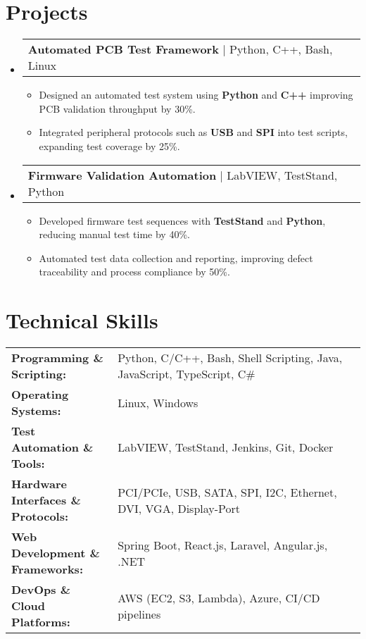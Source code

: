 \documentclass[letterpaper,11pt]{article}
\makeatletter
\newcommand{\resumeItem}[1]{
  \item\footnotesize{
    {#1 \vspace{-2pt}}
  }
}
\newcommand{\resumeProjectHeading}[2]{
    \item
    \begin{tabular*}{1.001\textwidth}{l@{\extracolsep{\fill}}r}
      \small#1 & \textbf{\small #2}\\
    \end{tabular*}\vspace{-7pt}
}
\newcommand{\resumeSubHeadingListStart}{\begin{itemize}[leftmargin=0pt, label={}]}
\newcommand{\resumeSubHeadingListEnd}{\end{itemize}}
\newcommand{\resumeItemListStart}{\begin{itemize}[leftmargin=*]}
\newcommand{\resumeItemListEnd}{\end{itemize}\vspace{-5pt}}
\makeatother
\begin{document}
\section{Projects}
    \vspace{-5pt}
    \resumeSubHeadingListStart
      \resumeProjectHeading
          {\textbf{Automated PCB Test Framework} | Python, C++, Bash, Linux}{}
          \resumeItemListStart
              \resumeItem{Designed an automated test system using \textbf{Python} and \textbf{C++} improving PCB validation throughput by 30\%.}
              \resumeItem{Integrated peripheral protocols such as \textbf{USB} and \textbf{SPI} into test scripts, expanding test coverage by 25\%.}
          \resumeItemListEnd
          \vspace{-16pt}
      \resumeProjectHeading
          {\textbf{Firmware Validation Automation} | LabVIEW, TestStand, Python}{}
          \resumeItemListStart
              \resumeItem{Developed firmware test sequences with \textbf{TestStand} and \textbf{Python}, reducing manual test time by 40\%.}
              \resumeItem{Automated test data collection and reporting, improving defect traceability and process compliance by 50\%.}
          \resumeItemListEnd
          \vspace{-16pt}
    \resumeSubHeadingListEnd
\vspace{-10pt}
\section{Technical Skills}
        \vspace{-14pt}
        \begin{table}[h]
            \footnotesize
            \begin{tabular}{p{0.3\linewidth} p{0.7\linewidth}}
                \textbf{Programming \& Scripting:} & Python, C/C++, Bash, Shell Scripting, Java, JavaScript, TypeScript, C\# \\
                \textbf{Operating Systems:} & Linux, Windows \\
                \textbf{Test Automation \& Tools:} & LabVIEW, TestStand, Jenkins, Git, Docker \\
                \textbf{Hardware Interfaces \& Protocols:} & PCI/PCIe, USB, SATA, SPI, I2C, Ethernet, DVI, VGA, Display-Port \\
                \textbf{Web Development \& Frameworks:} & Spring Boot, React.js, Laravel, Angular.js, .NET \\
                \textbf{DevOps \& Cloud Platforms:} & AWS (EC2, S3, Lambda), Azure, CI/CD pipelines \\
            \end{tabular}
        \end{table}
\end{document}

